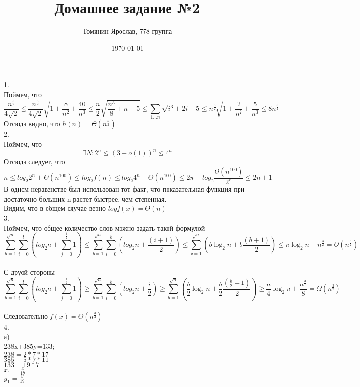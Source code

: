 \documentclass[a4paper,12pt]{article}
\author{Томинин Ярослав, 778 группа}
\title{Домашнее задание №2}
\date{\today}
\begin{document}
 

\maketitle
\newpage


1.\\ 
Поймем, что 
\[\frac{n^{\frac{5}{2}}}{4 \sqrt2} \leqslant 
\frac{n^{\frac{5}{2}}}{4 \sqrt2} \sqrt{1+\frac{8}{n^2}+\frac{40}{n^3}} \leqslant
\frac{n}{2} \sqrt{\frac{n^3}{8}+n+5} \leqslant
\sum_{1\dots{n}} \sqrt{i^3+2i+5} \leqslant
n^{\frac{5}{2}}\sqrt{1+\frac{2}{n^2}+\frac{5}{n^3}} \leqslant
8 n^{\frac{5}{2}}
\]
Отсюда видно, что $h(n)=\Theta(n^{\frac{5}{2}})$\\
2.\\
Поймем, что \[\exists N : 2^n \leqslant (3+o(1))^n\leqslant 4^n \]
Отсюда следует, что \[n \leqslant 
log_2 {2^n+\Theta(n^{100})}\leqslant
log_2 f(n) \leqslant
log_2 {4^n+\Theta(n^{100})}\leqslant
2n+log_2 {\frac{\Theta(n^{100})}{2^n}}\leqslant
2n+1
\]
В одном неравенстве был  использован тот факт, что показательная функция при достаточно больших n растет быстрее, чем степенная.\\
Видим, что в общем случае верно $log{f(x)= \Theta (n)}$\\
3.\\
Поймем, что общее количество слов можно задать такой формулой
\[\sum_{b=1}^{\sqrt{n}} \sum_{i=0}^{ b} (log_2 n + \sum_{j=0}^{\frac{i}{2}} 1) \leqslant
\sum_{b=1}^{\sqrt{n}} \sum_{i=0}^{ b} (log_2 n + \frac{(i+1)}{2})\leqslant
\sum_{b=1}^{\sqrt{n}} (b \log_2 n + b\frac{(b+1)}{2})\leqslant
n \log_2 n + n^{\frac{3}{2}}= O( n^{\frac{3}{2}})
\]\\
С друой стороны
\[\sum_{b=1}^{\sqrt{n}} \sum_{i=0}^{ b} (log_2 n + \sum_{j=0}^{\frac{i}{2}} 1) \geq
\sum_{b=1}^{\sqrt{n}} \sum_{i=0}^{ b} (log_2 n + \frac{i}{2})\geq
\sum_{b=1}^{\sqrt{n}} (\frac{b}{2} \log_2 n + \frac {b}{2}\frac{(\frac  {b}{2}+1)}{2})\geq
\frac{n}{4} \log_2 n + \frac{n^{\frac{3}{2}}}{8}= \Omega( n^{\frac{3}{2}})
\]\\
Следовательно $f(x)= \Theta (n^{\frac{3}{2}})$\\
4.\\
а)\\
238x+385y=133;\\
$238=2*7*17$\\
$385=5*7*11$\\
$133=19*7$\\
$x_1=\frac{x}{19}$\\
$y_1=\frac{y}{19}$\\
\end{document}
